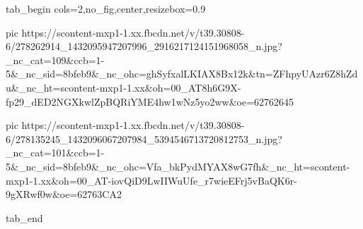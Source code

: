  
 
 
 
 

\ifcmt
  tab_begin cols=2,no_fig,center,resizebox=0.9

     pic https://scontent-mxp1-1.xx.fbcdn.net/v/t39.30808-6/278262914_1432095947207996_2916217124151968058_n.jpg?_nc_cat=109&ccb=1-5&_nc_sid=8bfeb9&_nc_ohc=ghSyfxalLKIAX8Bx12k&tn=ZFhpyUAzr6Z8hZdu&_nc_ht=scontent-mxp1-1.xx&oh=00_AT8h6G9X-fp29_dED2NGXkwlZpBQRiYME4hw1wNz5yo2ww&oe=62762645

     pic https://scontent-mxp1-1.xx.fbcdn.net/v/t39.30808-6/278135245_1432096067207984_5394546713720812753_n.jpg?_nc_cat=101&ccb=1-5&_nc_sid=8bfeb9&_nc_ohc=Vfa_bkPydMYAX8wG7fh&_nc_ht=scontent-mxp1-1.xx&oh=00_AT-iovQiD9LwIIWuUfe_r7wieEFrj5vBaQK6r-9gXRwf0w&oe=62763CA2

  tab_end
\fi

